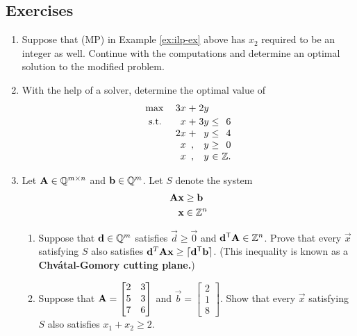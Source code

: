 \subsection*{Exercises}\label{exercises-10}

\begin{enumerate}
\def\labelenumi{\arabic{enumi}.}
\item
  Suppose that (MP) in Example \ref{ex:ilp-ex} above has \(x_2\)
  required to be an integer as well. Continue with the computations and
  determine an optimal solution to the modified problem.
\item
  With the help of a solver, determine the optimal value of
  \[
  \begin{array}{l r@{\;}c@{\;}r@{\;}c@{\;}r}
  \max & 3x & + & 2y &      &   \\[2pt]
  \st  & x  & + & 3y & \leq & 6 \\
       & 2x & + & y  & \leq & 4 \\
       & x  & , & y  & \geq & 0 \\
       & x  & , & y  & \in  & \Z.
  \end{array}
  \]
\item
  Let \(\mathbf{A} \in \mathbb{Q}^{m\times n}\) and \(\mathbf{b} \in \mathbb{Q}^m\). Let
  \(S\) denote the system
  \begin{align*}
    \mathbf{A} \mathbf{x} & \geq \mathbf{b}\\
    \mathbf{x} & \in \mathbb{Z}^n
  \end{align*}

  \begin{enumerate}
  \def\labelenumii{\alph{enumii}.}
  \item
    Suppose that \(\mathbf{d} \in \mathbb{Q}^m\) satisfies
    \(\vec{d} \geq \vec{0}\) and \(\mathbf{d}^{\mathsf{T}}\mathbf{A} \in \mathbb{Z}^n\). Prove
    that every \(\vec{x}\) satisfying \(S\) also satisfies
    \(\mathbf{d}^T\mathbf{A} \mathbf{x} \geq \lceil \mathbf{d}^{\mathsf{T}}\mathbf{b}\rceil\).
    (This inequality is known as a \textbf{Chvátal-Gomory cutting
    plane.})
  \item
    Suppose that
    \(\mathbf{A} = \begin{bmatrix} 2 & 3 \\ 5 & 3 \\ 7 & 6 \end{bmatrix}\)
    and \(\vec{b} = \begin{bmatrix} 2 \\ 1 \\ 8\end{bmatrix}\). Show
    that every \(\vec{x}\) satisfying \(S\) also satisfies
    \(x_1 + x_2 \geq 2\).
  \end{enumerate}
\end{enumerate}

